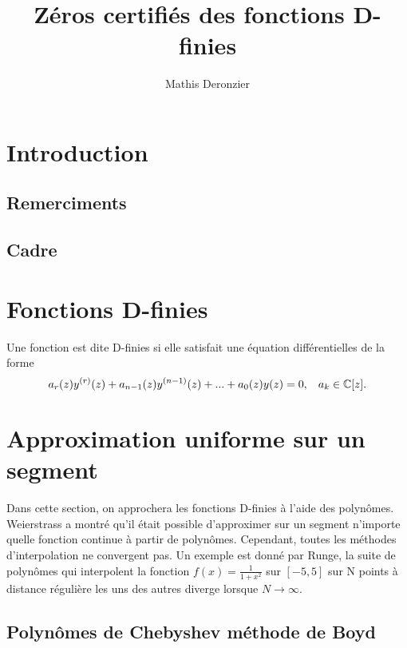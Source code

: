\documentclass[a4paper,10.5pt]{article}
\title{Zéros certifiés des fonctions D-finies}
\author{Mathis Deronzier}
\date{}
\begin{document}
	
	\maketitle
	\renewcommand{\contentsname}{Sommaire}
	\newpage
	\tableofcontents
	\newpage
	
	\section{Introduction}
	\newtheorem{theorem}{Théorème}[section] 
	\newtheorem{proposition}{Proposition}
	\newtheorem{corollaire}{Corollaire}
	\newtheorem{definition}{Définition}
	\subsection{Remerciments}
	\subsection{Cadre}
	\section{Fonctions D-finies}
	
	Une fonction est dite  D-finies si elle satisfait une équation différentielles de la forme
	\begin{equation}
		a_{r}(z)y^{(r)}(z)+a_{n-1}(z)y^{(n-1)}(z)+...+a_{0}(z)y(z)=0, \hspace{3mm} a_{k}\in \mathbb{C}[z].
	\end{equation}
 
	
	
	
	
	
	\section{Approximation uniforme sur un segment}
	
	Dans cette section, on approchera les fonctions D-finies à l'aide des polynômes.
	Weierstrass a montré qu'il était possible d'approximer sur un segment n'importe quelle fonction continue à partir de polynômes. Cependant, toutes les méthodes d'interpolation ne convergent pas. Un exemple est donné par Runge, la suite de polynômes qui interpolent la fonction $f(x)=\frac{1}{1+x^{2}}$ sur $[-5,5]$ sur N points à distance régulière les uns des autres diverge lorsque $N \rightarrow \infty$.
	
	\subsection{Polynômes de Chebyshev méthode de Boyd}
	
\end{document}
